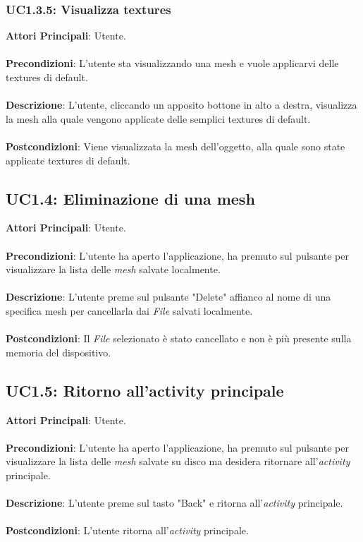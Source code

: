 \subsubsection{UC1.3.5: Visualizza textures}
\textbf{Attori Principali}: Utente.
\\\\ \textbf{Precondizioni}: L'utente sta visualizzando una mesh e vuole applicarvi delle textures di default.
\\\\ \textbf{Descrizione}: L'utente, cliccando un apposito bottone in alto a destra, visualizza la mesh alla quale vengono applicate delle semplici textures di default.
\\\\ \textbf{Postcondizioni}: Viene visualizzata la mesh dell'oggetto, alla quale sono state applicate textures di default.

\subsection{UC1.4: Eliminazione di una mesh}
\textbf{Attori Principali}: Utente.
\\\\ \textbf{Precondizioni}: L'utente ha aperto l'applicazione, ha premuto sul pulsante per visualizzare la lista delle \emph{mesh} salvate localmente.
\\\\ \textbf{Descrizione}: L'utente preme sul pulsante "Delete" affianco al nome di una specifica mesh per cancellarla dai \emph{File} salvati localmente.
\\\\ \textbf{Postcondizioni}: Il \emph{File} selezionato è stato cancellato e non è più presente sulla memoria del dispositivo.

\subsection{UC1.5: Ritorno all'activity principale}
\textbf{Attori Principali}: Utente.
\\\\ \textbf{Precondizioni}: L'utente ha aperto l'applicazione, ha premuto sul pulsante per visualizzare la lista delle \emph{mesh} salvate su disco ma desidera ritornare all'\emph{activity} principale.
\\\\ \textbf{Descrizione}: L'utente preme sul tasto "Back" e ritorna all'\emph{activity} principale.
\\\\ \textbf{Postcondizioni}: L'utente ritorna all'\emph{activity} principale.

